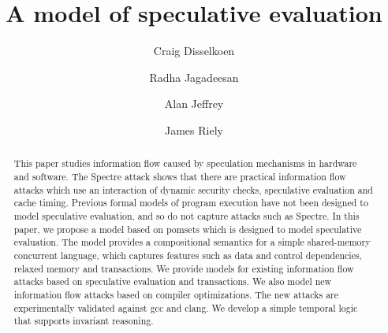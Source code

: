 \documentclass[acmsmall]{acmart}
\begin{document}
\title{A model of speculative evaluation}

\author{Craig Disselkoen}

\author{Radha Jagadeesan}

\author{Alan Jeffrey}

\author{James Riely}

\begin{abstract}
  This paper studies information flow caused by speculation mechanisms
  in hardware and software.  The Spectre attack shows that there are
  practical information flow attacks which use an interaction of
  dynamic security checks, speculative evaluation and cache timing.
  Previous formal models of program execution have not been designed
  to model speculative evaluation, and so do not capture attacks such
  as Spectre. In this paper, we propose a model based on pomsets which
  is designed to model speculative evaluation. The model provides a
  compositional semantics for a simple shared-memory concurrent
  language, which captures features such as data and control
  dependencies, relaxed memory and transactions. We provide models for
  existing information flow attacks based on speculative evaluation
  and transactions.  We also model new information flow attacks based on compiler
  optimizations. The new attacks are experimentally validated against
  gcc and clang.  We develop a simple temporal logic that supports 
  invariant reasoning.
\end{abstract}

\maketitle










\clearpage
\appendix

\end{document}
